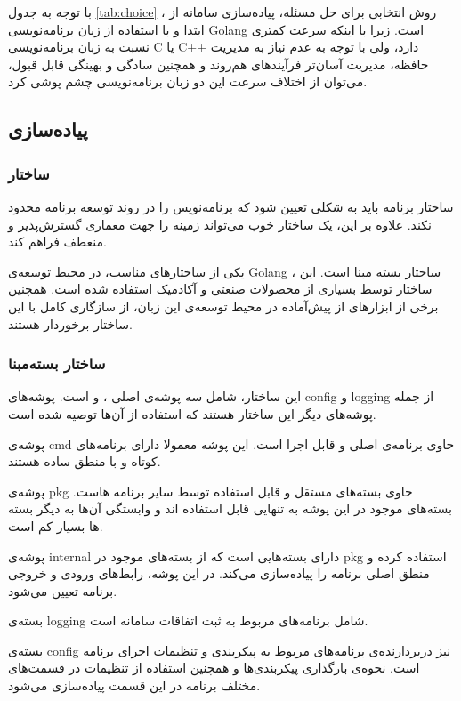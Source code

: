 با توجه به جدول
\ref{tab:choice}
، روش انتخابی برای حل مسئله،‌ پیاده‌سازی سامانه از ابتدا و با استفاده از زبان برنامه‌نویسی Golang است. زیرا با اینکه سرعت کمتری نسبت به زبان برنامه‌نویسی C یا C++ دارد، ولی با توجه به عدم نیاز به مدیریت حافظه، مدیریت آسان‌تر فرآیند‌های هم‌روند و همچنین سادگی و بهینگی قابل قبول،‌ می‌توان از اختلاف سرعت این دو زبان برنامه‌نویسی چشم پوشی کرد.

\subsection{پیاده‌سازی}\label{subsec:impl_impl}

\subsubsection{ساختار}
ساختار برنامه‌ باید به شکلی تعیین شود که برنامه‌نویس را در روند توسعه برنامه محدود نکند. علاوه بر این، یک ساختار خوب می‌تواند زمینه را جهت معماری گسترش‌پذیر و منعطف فراهم کند.

یکی از ساختار‌های مناسب، در محیط توسعه‌ی Golang ، ساختار بسته مبنا است. این ساختار توسط بسیاری از محصولات صنعتی و آکادمیک استفاده شده است. همچنین برخی از ابزار‌های از پیش‌آماده در محیط توسعه‌ی این زبان، از سازگاری کامل با این ساختار برخوردار هستند.

\subsubsection{ساختار بسته‌مبنا }
این ساختار، شامل سه پوشه‌ی اصلی ،  و  است. پوشه‌های config و logging از جمله پوشه‌های دیگر این ساختار هستند که استفاده از آن‌ها توصیه شده است.

پوشه‌ی cmd حاوی برنامه‌ی اصلی و قابل اجرا است. این پوشه معمولا دارای برنامه‌های کوتاه و با منطق ساده هستند.

پوشه‌ی pkg حاوی بسته‌های مستقل و قابل استفاده توسط سایر برنامه هاست. بسته‌های موجود در این پوشه به تنهایی قابل استفاده اند و وابستگی آن‌ها به دیگر بسته ها بسیار کم است.

پوشه‌ی internal دارای بسته‌هایی است که از بسته‌های موجود در pkg استفاده کرده و منطق اصلی برنامه را پیاده‌سازی می‌کند. در این پوشه، رابط‌های ورودی و خروجی برنامه تعیین می‌شود.

بسته‌ی logging شامل برنامه‌های مربوط به ثبت اتفاقات سامانه است.

بسته‌ی config نیز دربردارنده‌ی برنامه‌های مربوط به پیکربندی و تنظیمات اجرای برنامه است. نحوه‌ی بارگذاری پیکربندی‌ها و همچنین استفاده از تنظیمات در قسمت‌های مختلف برنامه در این قسمت پیاده‌سازی می‌شود.

